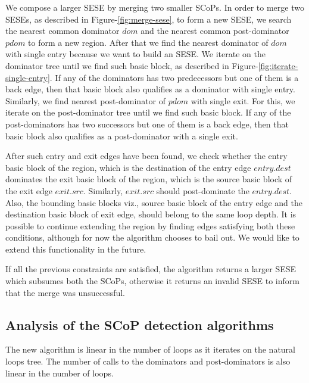 \documentclass{sig-alternate}
\begin{document}

We compose a larger SESE by merging two smaller SCoPs. In order to merge two
SESEs, as described in Figure-\ref{fig:merge-sese}, to form a new SESE, we
search the nearest common dominator $dom$ and the nearest common post-dominator
$pdom$ to form a new region.  After that we find the nearest dominator of $dom$
with single entry because we want to build an SESE.  We iterate on the dominator
tree until we find such basic block, as described in
Figure-\ref{fig:iterate-single-entry}.  If any of the dominators has two
predecessors but one of them is a back edge, then that basic block also
qualifies as a dominator with single entry.  Similarly, we find nearest
post-dominator of $pdom$ with single exit.  For this, we iterate on the
post-dominator tree until we find such basic block.  If any of the
post-dominators has two successors but one of them is a back edge, then that
basic block also qualifies as a post-dominator with a single exit.

After such entry and exit edges have been found, we check whether the entry
basic block of the region, which is the destination of the entry edge
$entry.dest$ dominates the exit basic block of the region, which is the source
basic block of the exit edge $exit.src$.  Similarly, $exit.src$ should
post-dominate the $entry.dest$.  Also, the bounding basic blocks viz., source
basic block of the entry edge and the destination basic block of exit edge,
should belong to the same loop depth.  It is possible to continue extending the
region by finding edges satisfying both these conditions, although for now the
algorithm chooses to bail out.  We would like to extend this functionality in the
future.

If all the previous constraints are satisfied, the algorithm returns a larger
SESE which subsumes both the SCoPs, otherwise it returns an invalid SESE to
inform that the merge was unsuccessful.

\subsection{Analysis of the SCoP detection algorithms}
The new algorithm is linear in the number of loops as it iterates on the
natural loops tree.  The number of calls to the dominators and post-dominators
is also linear in the number of loops.
\end{document}
